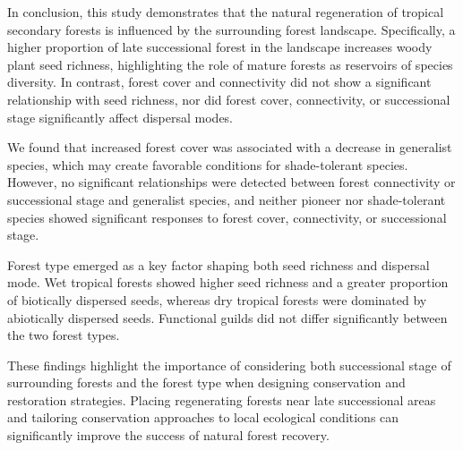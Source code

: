 


In conclusion, this study demonstrates that the natural regeneration of tropical secondary forests is influenced by the surrounding forest landscape. Specifically, a higher proportion of late successional forest in the landscape increases woody plant seed richness, highlighting the role of mature forests as reservoirs of species diversity. In contrast, forest cover and connectivity did not show a significant relationship with seed richness, nor did forest cover, connectivity, or successional stage significantly affect dispersal modes.

We found that increased forest cover was associated with a decrease in generalist species, which may create favorable conditions for shade-tolerant species. However, no significant relationships were detected between forest connectivity or successional stage and generalist species, and neither pioneer nor shade-tolerant species showed significant responses to forest cover, connectivity, or successional stage.

Forest type emerged as a key factor shaping both seed richness and dispersal mode. Wet tropical forests showed higher seed richness and a greater proportion of biotically dispersed seeds, whereas dry tropical forests were dominated by abiotically dispersed seeds. Functional guilds did not differ significantly between the two forest types.

These findings highlight the importance of considering both successional stage of surrounding forests and the forest type when designing conservation and restoration strategies. Placing regenerating forests near late successional areas and tailoring conservation approaches to local ecological conditions can significantly improve the success of natural forest recovery.

